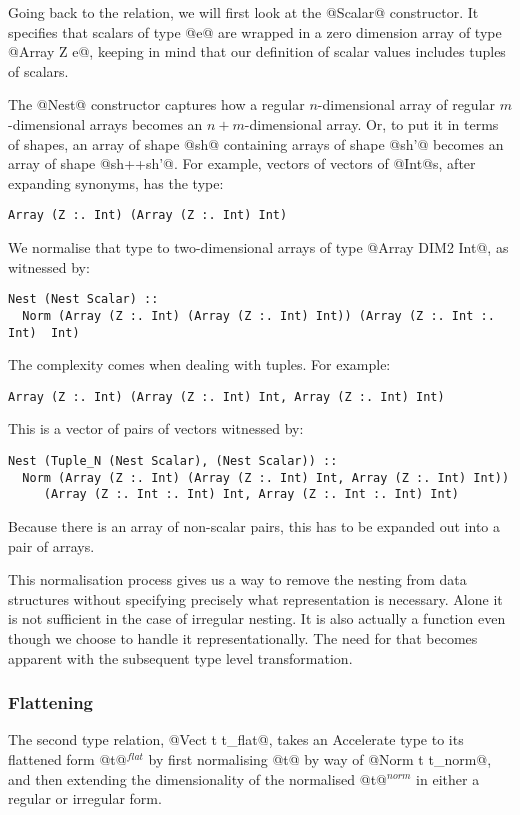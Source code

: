 Going back to the relation, we will first look at the @Scalar@ constructor. It specifies that scalars of type @e@ are wrapped in a zero dimension array of type @Array Z e@, keeping in mind that our definition of scalar values includes tuples of scalars.

The @Nest@ constructor captures how a regular $n$-dimensional array of regular $m$-dimensional arrays becomes an $n+m$-dimensional array. Or, to put it in terms of shapes, an array of shape @sh@ containing arrays of shape @sh'@ becomes an array of shape @sh++sh'@.
For example, vectors of vectors of @Int@s, after expanding synonyms, has the type:
%
\begin{lstlisting}[style=ndp]
Array (Z :. Int) (Array (Z :. Int) Int)
\end{lstlisting}
%
We normalise that type to two-dimensional arrays of type @Array DIM2 Int@, as witnessed by:
%
\begin{lstlisting}[style=ndp]
Nest (Nest Scalar) ::
  Norm (Array (Z :. Int) (Array (Z :. Int) Int)) (Array (Z :. Int :. Int)  Int)
\end{lstlisting}
%
The complexity comes when dealing with tuples. For example:
%
\begin{lstlisting}[style=ndp]
Array (Z :. Int) (Array (Z :. Int) Int, Array (Z :. Int) Int)
\end{lstlisting}
%
This is a vector of pairs of vectors witnessed by:
%
\begin{lstlisting}[style=ndp]
Nest (Tuple_N (Nest Scalar), (Nest Scalar)) ::
  Norm (Array (Z :. Int) (Array (Z :. Int) Int, Array (Z :. Int) Int))
     (Array (Z :. Int :. Int) Int, Array (Z :. Int :. Int) Int)
\end{lstlisting}
%
Because there is an array of non-scalar pairs, this has to be expanded out into a pair of arrays.

This normalisation process gives us a way to remove the nesting from data structures without specifying precisely what representation is necessary. Alone it is not sufficient in the case of irregular nesting. It is also actually a function even though we choose to handle it representationally. The need for that becomes apparent with the subsequent type level transformation.

\subsubsection{Flattening}
The second type relation, @Vect t t_flat@, takes an Accelerate type to its flattened form @t@$^{\textit{flat}}$ by first normalising @t@ by way of @Norm t t_norm@, and then extending the dimensionality of the normalised @t@$^{\textit{norm}}$ in either a regular or irregular form.

